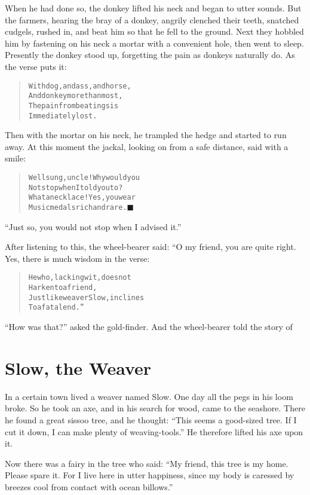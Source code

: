 \documentclass[article, twoside, 14pt]{memoir}
\newcommand{\qed}{\hfill \ensuremath{\blacksquare}}
\renewenvironment{verbatim}{%
\begin{quote}%
\vskip -10pt%
\begin{alltt}\normalfont\large}{\end{alltt}%
\end{quote}%
\vskip -10pt
} %
\begin{document}
When he had done so, the donkey lifted his neck and began to utter
sounds. But the farmers, hearing the bray of a donkey, angrily
clenched their teeth, snatched cudgels, rushed in, and beat him so
that he fell to the ground. Next they hobbled him by fastening on
his neck a mortar with a convenient hole, then went to sleep.
Presently the donkey stood up, forgetting the pain as donkeys
naturally do. As the verse puts it:

\begin{verbatim}
With dog, and ass, and horse,
    And donkey more than most,
The pain from beatings is
    Immediately lost.
\end{verbatim}
Then with the mortar on his neck, he trampled the hedge and started
to run away. At this moment the jackal, looking on from a safe
distance, said with a smile:

\begin{verbatim}
Well sung, uncle! Why would you
Not stop when I told you to?
What a necklace! Yes, you wear
Music medals rich and rare.\hyperref[s84]{\qed}
\end{verbatim}
``Just so, you would not stop when I advised it.''

After listening to this, the wheel-bearer said: “O my friend, you
are quite right. Yes, there is much wisdom in the verse:

\begin{verbatim}
He who, lacking wit, does not
    Harken to a friend,
Just like weaver Slow, inclines
    To a fatal end.”
\end{verbatim}
``How was that?'' asked the gold-finder. And the wheel-bearer told
the story of

\chapter{Slow, the Weaver}

\label{s85}

In a certain town lived a weaver named Slow. One day all the pegs
in his loom broke. So he took an axe, and in his search for wood,
came to the seashore. There he found a great sissoo tree, and he
thought:
``This seems a good-sized tree. If I cut it down, I can make plenty of weaving-tools.''
He therefore lifted his axe upon it.

Now there was a fairy in the tree who said:
``My friend, this tree is my home. Please spare it. For I live here in utter happiness, since my body is caressed by breezes cool from contact with ocean billows.''
\end{document}
